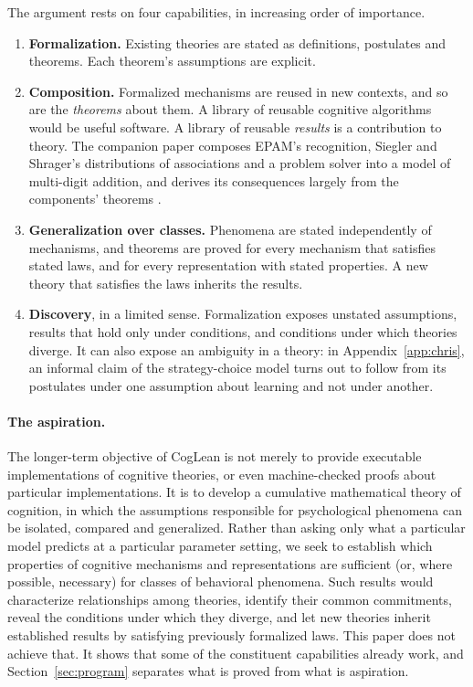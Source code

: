 \documentclass[11pt]{article}
\begin{document}
The argument rests on four capabilities, in increasing order of importance.
\begin{enumerate}
  \item \textbf{Formalization.} Existing theories are stated as definitions, postulates and theorems. Each theorem's assumptions are explicit.
  \item \textbf{Composition.} Formalized mechanisms are reused in new contexts, and so are the \emph{theorems} about them. A library of reusable cognitive algorithms would be useful software. A library of reusable \emph{results} is a contribution to theory. The companion paper composes EPAM's recognition, Siegler and Shrager's distributions of associations and a problem solver into a model of multi-digit addition, and derives its consequences largely from the components' theorems \citep{shrager2026multidigit}.
  \item \textbf{Generalization over classes.} Phenomena are stated independently of mechanisms, and theorems are proved for every mechanism that satisfies stated laws, and for every representation with stated properties. A new theory that satisfies the laws inherits the results.
  \item \textbf{Discovery}, in a limited sense. Formalization exposes unstated assumptions, results that hold only under conditions, and conditions under which theories diverge. It can also expose an ambiguity in a theory: in Appendix~\ref{app:chris}, an informal claim of the strategy-choice model turns out to follow from its postulates under one assumption about learning and not under another.
\end{enumerate}

\paragraph{The aspiration.} The longer-term objective of CogLean is not merely to provide executable implementations of cognitive theories, or even machine-checked proofs about particular implementations. It is to develop a cumulative mathematical theory of cognition, in which the assumptions responsible for psychological phenomena can be isolated, compared and generalized. Rather than asking only what a particular model predicts at a particular parameter setting, we seek to establish which properties of cognitive mechanisms and representations are sufficient (or, where possible, necessary) for classes of behavioral phenomena. Such results would characterize relationships among theories, identify their common commitments, reveal the conditions under which they diverge, and let new theories inherit established results by satisfying previously formalized laws. This paper does not achieve that. It shows that some of the constituent capabilities already work, and Section~\ref{sec:program} separates what is proved from what is aspiration.
\end{document}
